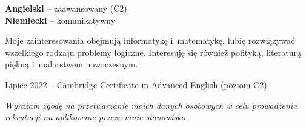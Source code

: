 \documentclass[8pt]{developercv} %
\begin{document}
\begin{minipage}[t]{0.3\textwidth}
  \vspace{-\baselineskip}


  \textbf{Angielski} -- zaawansowany (C2)\\
  \textbf{Niemiecki} -- komunikatywny
\end{minipage}
\hfill
\begin{minipage}[t]{0.3\textwidth}
  \vspace{-\baselineskip}


  Moje zainteresowania obejmują informatykę i~matematykę,
  lubię rozwiązywać wszelkiego rodzaju problemy logiczne.
  Interesuję się również polityką, literaturą piękną i~malarstwem nowoczesnym.
\end{minipage}
\hfill
\begin{minipage}[t]{0.35\textwidth}
  \vspace{-\baselineskip}

  Lipiec 2022 -- Cambridge Certificate in Advanced English (poziom C2)
\end{minipage}


\vspace{15pt}

\centering\begin{minipage}{0.6\linewidth}
  \centering\textit{
  Wyrażam zgodę na przetwarzanie moich danych osobowych w celu prowadzenia rekrutacji na aplikowane przeze mnie stanowisko.
}
\end{minipage}
\end{document}
